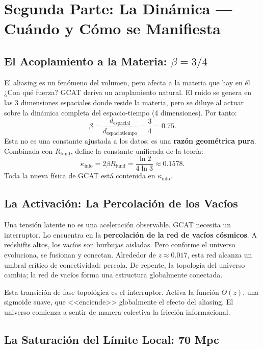 \documentclass[12pt, a4paper]{article}
\begin{document}
\section{Segunda Parte: La Dinámica — Cuándo y Cómo se Manifiesta}

\subsection{El Acoplamiento a la Materia: \texorpdfstring{$\beta = 3/4$}{beta = 3/4}}

El aliasing es un fenómeno del volumen, pero afecta a la materia que hay en él. ¿Con qué fuerza? GCAT deriva un acoplamiento natural. El ruido se genera en las 3 dimensiones espaciales donde reside la materia, pero se diluye al actuar sobre la dinámica completa del espacio-tiempo (4 dimensiones). Por tanto:
\begin{equation}
\beta = \frac{d_{\text{espacial}}}{d_{\text{espaciotiempo}}} = \frac{3}{4} = 0.75.
\end{equation}
Esta no es una constante ajustada a los datos; es una \textbf{razón geométrica pura}. Combinada con $R_{\text{fund}}$, define la constante unificada de la teoría:
\begin{equation}
\kappa_{\text{info}} = 2\beta R_{\text{fund}} = \frac{\ln 2}{4 \ln 3} \approx 0.1578.
\end{equation}
Toda la nueva física de GCAT está contenida en $\kappa_{\text{info}}$.

\subsection{La Activación: La Percolación de los Vacíos}

Una tensión latente no es una aceleración observable. GCAT necesita un interruptor. Lo encuentra en la \textbf{percolación de la red de vacíos cósmicos}. A redshifts altos, los vacíos son burbujas aisladas. Pero conforme el universo evoluciona, se fusionan y conectan. Alrededor de $z \approx 0.017$, esta red alcanza un umbral crítico de conectividad: percola. De repente, la topología del universo cambia; la red de vacíos forma una estructura globalmente conectada.

Esta transición de fase topológica es el interruptor. Activa la función $\Theta(z)$, una sigmoide suave, que <<enciende>> globalmente el efecto del aliasing. El universo comienza a sentir de manera colectiva la fricción informacional.

\subsection{La Saturación del Límite Local: 70 Mpc}
\end{document}
